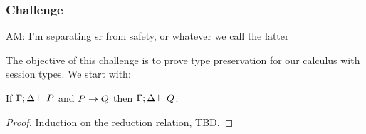 
\subsubsection{Challenge}
\begin{metanote}
AM:  I'm separating sr from safety, or whatever we call the latter
\end{metanote}
The objective of this challenge is to prove type preservation for our calculus with session types. We start with:
\begin{theorem}
  If \( \Gamma;\Delta \vdash P \) and \( P \rightarrow Q \) then \( \Gamma;\Delta \vdash Q \).
\end{theorem}
\begin{proof}
  Induction on the reduction relation, TBD.
\end{proof}


